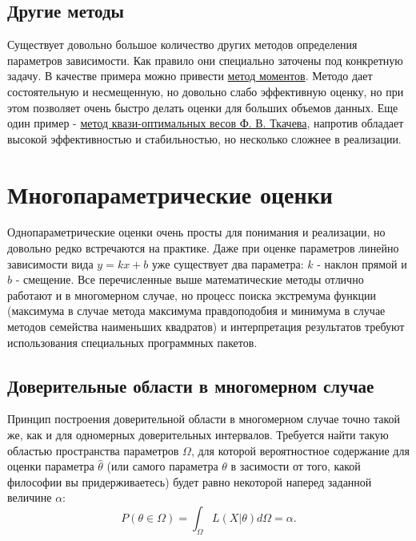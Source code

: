 
\subsection{Другие методы}

    Существует довольно большое количество других методов определения
параметров зависимости. Как правило они специально заточены под
конкретную задачу. В качестве примера можно привести
\href{https://ru.wikipedia.org/wiki/\%D0\%9C\%D0\%B5\%D1\%82\%D0\%BE\%D0\%B4_\%D0\%BC\%D0\%BE\%D0\%BC\%D0\%B5\%D0\%BD\%D1\%82\%D0\%BE\%D0\%B2}{метод
моментов}. Методо дает состоятельную и несмещенную, но довольно слабо
эффективную оценку, но при этом позволяет очень быстро делать оценки для
больших объемов данных. Еще один пример -
\href{https://arxiv.org/abs/physics/0604127}{метод квази-оптимальных
весов Ф. В. Ткачева}, напротив обладает высокой эффективностью и
стабильностью, но несколько сложнее в реализации.

\section{Многопараметрические оценки}

    Однопараметрические оценки очень просты для понимания и реализации, но
довольно редко встречаются на практике. Даже при оценке параметров
линейно зависимости вида $y = k x + b$ уже существует два параметра:
$k$ - наклон прямой и $b$ - смещение. Все перечисленные выше
математические методы отлично работают и в многомерном случае, но
процесс поиска экстремума функции (максимума в случае метода максимума
правдоподобия и минимума в случае методов семейства наименьших
квадратов) и интерпретация результатов требуют использования специальных
программных пакетов.


\subsection{Доверительные области в многомерном случае}

    Принцип построения доверительной области в многомерном случае точно
такой же, как и для одномерных доверительных интервалов. Требуется найти
такую областью пространства параметров $\Omega$, для которой
вероятностное содержание для оценки параметра $\hat \theta$ (или
самого параметра $\theta$ в засимости от того, какой философии вы
придерживаетесь) будет равно некоторой наперед заданной величине
$\alpha$: \begin{equation}
  P(\theta \in \Omega) = \int_\Omega{L(X | \theta)}d\Omega = \alpha.
\end{equation}

